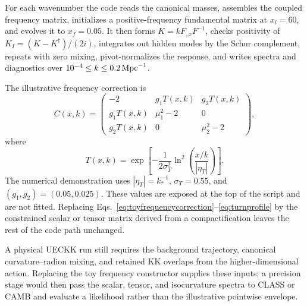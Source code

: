 \documentclass[aps,prd,twocolumn,superscriptaddress,nofootinbib,longbibliography,floatfix]{revtex4-2}
\begin{document}
For each wavenumber the code reads the canonical masses, assembles the coupled frequency matrix, initializes a positive-frequency fundamental matrix at $x_i=60$, and evolves it to $x_f=0.05$. It then forms $K=kF_{,x}F^{-1}$, checks positivity of $K_I=(K-K^\dagger)/(2i)$, integrates out hidden modes by the Schur complement, repeats with zero mixing, pivot-normalizes the response, and writes spectra and diagnostics over $10^{-4}\leq k\leq0.2\,{\rm Mpc}^{-1}$.

The illustrative frequency correction is
\begin{equation}
C(x,k)=
\begin{pmatrix}
-2 & g_1T(x,k) & g_2T(x,k)\\
g_1T(x,k) & \mu_1^2-2 & 0\\
g_2T(x,k) & 0 & \mu_2^2-2
\end{pmatrix},
\label{eq:toyfrequencycorrection}
\end{equation}
where
\begin{equation}
T(x,k)=\exp\left[-\frac{1}{2\sigma_T^2}
\ln^2\left(\frac{x/k}{|\eta_T|}\right)\right].
\label{eq:turnprofile}
\end{equation}
The numerical demonstration uses $|\eta_T|=k_*^{-1}$, $\sigma_T=0.55$, and $(g_1,g_2)=(0.05,0.025)$.  These values are exposed at the top of the script and are not fitted.  Replacing Eqs.~\eqref{eq:toyfrequencycorrection}--\eqref{eq:turnprofile} by the constrained scalar or tensor matrix derived from a compactification leaves the rest of the code path unchanged.

A physical UECKK run still requires the background trajectory, canonical curvature--radion mixing, and retained KK overlaps from the higher-dimensional action. Replacing the toy frequency constructor supplies these inputs; a precision stage would then pass the scalar, tensor, and isocurvature spectra to CLASS or CAMB and evaluate a likelihood rather than the illustrative pointwise envelope.

\nocite{REVTEX42Control}


\end{document}
